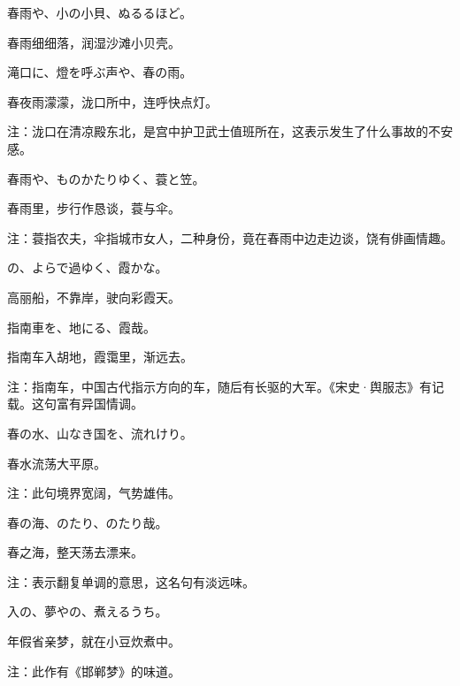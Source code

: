 \begin{haiku}
    {\FH 春雨や、小の小貝、ぬるるほど。}

    {\FK 春雨细细落，润湿沙滩小贝壳。}
\end{haiku}

\begin{haiku}
    {\FH 滝口に、燈を呼ぶ声や、春の雨。}

    {\FK 春夜雨濛濛，泷口所中，连呼快点灯。}

    {\FT 注：泷口在清凉殿东北，是宫中护卫武士值班所在，这表示发生了什么事故的不安感。}
\end{haiku}

\begin{haiku}
    {\FH 春雨や、ものかたりゆく、蓑と笠。}

    {\FK 春雨里，步行作恳谈，蓑与伞。}

    {\FT 注：蓑指农夫，伞指城市女人，二种身份，竟在春雨中边走边谈，饶有俳画情趣。}
\end{haiku}

\begin{haiku}
    {\FH {}の、よらで過ゆく、霞かな。}

    {\FK 高丽船，不靠岸，驶向彩霞天。}
\end{haiku}

\begin{haiku}
    {\FH 指南車を、地にる、霞哉。}

    {\FK 指南车入胡地，霞霭里，渐远去。}

    {\FT 注：指南车，中国古代指示方向的车，随后有长驱的大军。《宋史·舆服志》有记载。这句富有异国情调。}
\end{haiku}

\begin{haiku}
    {\FH 春の水、山なき国を、流れけり。}

    {\FK 春水流荡大平原。}

    {\FT 注：此句境界宽阔，气势雄伟。}
\end{haiku}

\begin{haiku}
    {\FH 春の海、のたり、のたり哉。}

    {\FK 春之海，整天荡去漂来。}

    {\FT 注：表示翻复单调的意思，这名句有淡远味。}
\end{haiku}

\begin{haiku}
    {\FH {}入の、夢やの、煮えるうち。}

    {\FK 年假省亲梦，就在小豆炊煮中。}

    {\FT 注：此作有《邯郸梦》的味道。}
\end{haiku}

